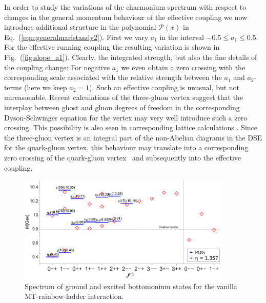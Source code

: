 In order to study the variations of the charmonium spectrum with respect to changes in the
general momentum behaviour of the effective coupling we now introduce
additional structure in the polynomial $\mathcal{P}(x)$ in Eq.~(\ref{eqn:generalmaristandy2}). 
First we vary $a_1$ in the interval
$-0.5 \le a_1 \le 0.5$. For the effective running coupling the resulting variation
is shown in Fig.~(\ref{fig:slope_a1}). Clearly, the integrated strength, but
also the fine details of the coupling change: For negative $a_1$ we even obtain 
a zero crossing with the corresponding scale associated with the relative
strength between the $a_1$ and $a_2$-terms (here we keep $a_2=1$). Such an 
effective coupling is unusual, but not unreasonable. Recent calculations of 
the three-gluon vertex \cite{Aguilar:2013vaa,Blum:2014gna,Eichmann:2014xya} suggest that the interplay between 
ghost and gluon degrees of freedom in the corresponding Dyson-Schwinger equation 
for the vertex may very well introduce such a zero crossing. This possibility is also 
seen in corresponding lattice calculations \cite{Cucchieri:2008qm}. Since the three-gluon 
vertex is an integral part of the non-Abelian diagrams in the DSE for the quark-gluon vertex, 
this behaviour may translate into a corresponding zero crossing of the quark-gluon 
vertex~\cite{Williams:2014iea} and subsequently into the effective coupling.

\begin{figure}[t!]
  \begin{center}
    \includegraphics[width=0.90\textwidth]{figures/spectrum_bb}
    \caption{Spectrum of ground and excited bottomonium states for the vanilla MT-rainbow-ladder interaction.}\label{fig:bottom}
  \end{center}
\end{figure}

